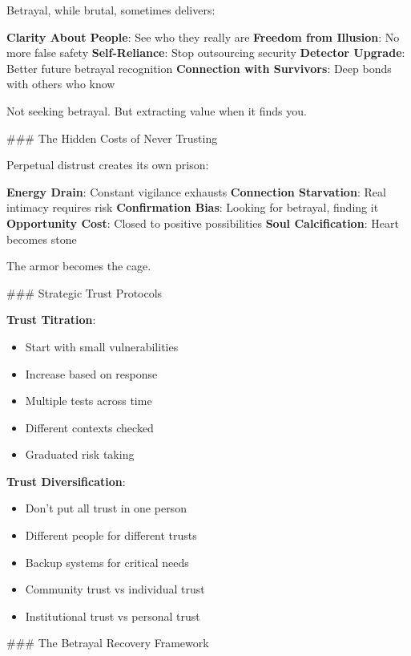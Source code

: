 \documentclass[12pt]{book}
\begin{document}
Betrayal, while brutal, sometimes delivers:

\textbf{Clarity About People}: See who they really are
\textbf{Freedom from Illusion}: No more false safety
\textbf{Self-Reliance}: Stop outsourcing security
\textbf{Detector Upgrade}: Better future betrayal recognition
\textbf{Connection with Survivors}: Deep bonds with others who know

Not seeking betrayal. But extracting value when it finds you.

\#\#\# The Hidden Costs of Never Trusting

Perpetual distrust creates its own prison:

\textbf{Energy Drain}: Constant vigilance exhausts
\textbf{Connection Starvation}: Real intimacy requires risk
\textbf{Confirmation Bias}: Looking for betrayal, finding it
\textbf{Opportunity Cost}: Closed to positive possibilities
\textbf{Soul Calcification}: Heart becomes stone

The armor becomes the cage.

\#\#\# Strategic Trust Protocols

\textbf{Trust Titration}:
\begin{itemize}
\item Start with small vulnerabilities
\item Increase based on response
\item Multiple tests across time
\item Different contexts checked
\item Graduated risk taking

\end{itemize}
\textbf{Trust Diversification}:
\begin{itemize}
\item Don't put all trust in one person
\item Different people for different trusts
\item Backup systems for critical needs
\item Community trust vs individual trust
\item Institutional trust vs personal trust

\end{itemize}
\#\#\# The Betrayal Recovery Framework
\end{document}
